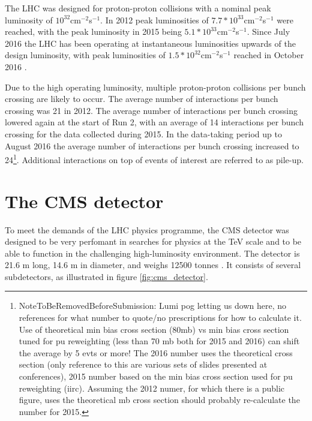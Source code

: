 The \ac{LHC} was designed for proton-proton collisions with a nominal
peak luminosity of $10^{32}$cm$^{-2}$s$^{-1}$. In 2012 peak
luminosities of $7.7*10^{33}$cm$^{-2}$s$^{-1}$ were reached, with the peak luminosity in
2015 being $5.1*10^{33}$cm$^{-2}$s$^{-1}$. Since July 2016
the \ac{LHC} has been operating at instantaneous luminosities upwards of the 
design luminosity, with peak luminosities of $1.5*10^{32}$cm$^{-2}$s$^{-1}$ reached
in October 2016 \cite{cms-lumi-public}.

Due to the high operating luminosity, multiple proton-proton collisions per 
bunch crossing are likely to occur. The average number of interactions
per bunch crossing was 21 in 2012\cite{cms-lumi-public}. The average number of
interactions per bunch crossing lowered again at the start of Run 2, with
an average of 14 interactions per bunch crossing for the data collected
during 2015. In the data-taking period up to August 2016 the average number of interactions
per bunch crossing increased to 24\footnote{NoteToBeRemovedBeforeSubmission: Lumi pog letting us down 
here, no references for what number to quote/no prescriptions for how to calculate it. Use of theoretical
min bias cross section (80mb) vs min bias cross section tuned for pu reweighting (less than 70 mb both for
2015 and 2016) can shift the average by 5 evts or more! The 2016 number uses the theoretical
cross section (only reference to this are various sets of slides presented at conferences), 2015
number based on the min bias cross section used for pu reweighting (iirc). Assuming the 2012 numer,
for which there is a public figure, uses the theoretical mb cross section should probably re-calculate the
number for 2015.}. Additional 
interactions on top of events of interest are referred to as pile-up.

\section{The \acs{CMS} detector}
\label{sec:CMSLHC_CMS}
To meet the demands of the \ac{LHC} physics programme, the
 \ac{CMS} detector was designed to be very perfomant in searches
for physics at the TeV scale and to be able to 
function in the challenging high-luminosity environment.
The detector is 21.6 m long, 14.6 m in diameter, and weighs
12500 tonnes \cite{cms-jinst}. It consists of several subdetectors, as illustrated
in figure \ref{fig:cms_detector}.

